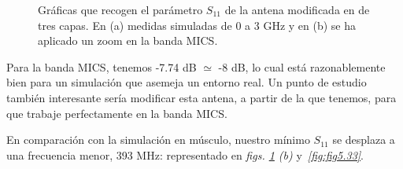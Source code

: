\begin{figure}[!htb]
    \centering
    \caption{Gráficas que recogen el parámetro $S_{11}$ de la antena modificada en de tres capas. En (a) medidas simuladas de 0 a 3 GHz y en (b) se ha aplicado un zoom en la banda MICS.}
    \label{fig:fig5.32}
\end{figure}

Para la banda MICS, tenemos -7.74 dB $\simeq$ -8 dB, lo cual está razonablemente bien para un simulación que asemeja un entorno real. Un punto de estudio también interesante sería modificar esta antena, a partir de la que tenemos, para que trabaje perfectamente en la banda MICS.

\clearpage

En comparación con la simulación en músculo, nuestro mínimo $S_{11}$ se desplaza a una frecuencia menor, 393 MHz: representado en \textit{figs. \ref{fig:fig5.32} (b)} y~\textit{\ref{fig:fig5.33}}.

